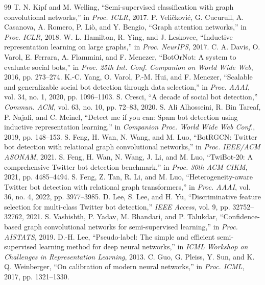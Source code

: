 \documentclass[conference]{IEEEtran}
\begin{document}
\begin{thebibliography}{99}
 T. N. Kipf and M. Welling, ``Semi-supervised classification with graph convolutional networks,'' in \emph{Proc. ICLR}, 2017.
 P. Veli\v{c}kovi\'c, G. Cucurull, A. Casanova, A. Romero, P. Li\`o, and Y. Bengio, ``Graph attention networks,'' in \emph{Proc. ICLR}, 2018.
 W. L. Hamilton, R. Ying, and J. Leskovec, ``Inductive representation learning on large graphs,'' in \emph{Proc. NeurIPS}, 2017.
 C. A. Davis, O. Varol, E. Ferrara, A. Flammini, and F. Menczer, ``BotOrNot: A system to evaluate social bots,'' in \emph{Proc. 25th Int. Conf. Companion on World Wide Web}, 2016, pp. 273--274.
 K.-C. Yang, O. Varol, P.-M. Hui, and F. Menczer, ``Scalable and generalizable social bot detection through data selection,'' in \emph{Proc. AAAI}, vol. 34, no. 1, 2020, pp. 1096--1103.
 S. Cresci, ``A decade of social bot detection,'' \emph{Commun. ACM}, vol. 63, no. 10, pp. 72--83, 2020.
 S. Ali Alhosseini, R. Bin Tareaf, P. Najafi, and C. Meinel, ``Detect me if you can: Spam bot detection using inductive representation learning,'' in \emph{Companion Proc. World Wide Web Conf.}, 2019, pp. 148--153.
 S. Feng, H. Wan, N. Wang, and M. Luo, ``BotRGCN: Twitter bot detection with relational graph convolutional networks,'' in \emph{Proc. IEEE/ACM ASONAM}, 2021.
 S. Feng, H. Wan, N. Wang, J. Li, and M. Luo, ``TwiBot-20: A comprehensive Twitter bot detection benchmark,'' in \emph{Proc. 30th ACM CIKM}, 2021, pp. 4485--4494.
 S. Feng, Z. Tan, R. Li, and M. Luo, ``Heterogeneity-aware Twitter bot detection with relational graph transformers,'' in \emph{Proc. AAAI}, vol. 36, no. 4, 2022, pp. 3977--3985.
 D. Lee, S. Lee, and H. Yu, ``Discriminative feature selection for multi-class Twitter bot detection,'' \emph{IEEE Access}, vol. 9, pp. 32752--32762, 2021.
 S. Vashishth, P. Yadav, M. Bhandari, and P. Talukdar, ``Confidence-based graph convolutional networks for semi-supervised learning,'' in \emph{Proc. AISTATS}, 2019.
 D.-H. Lee, ``Pseudo-label: The simple and efficient semi-supervised learning method for deep neural networks,'' in \emph{ICML Workshop on Challenges in Representation Learning}, 2013.
 C. Guo, G. Pleiss, Y. Sun, and K. Q. Weinberger, ``On calibration of modern neural networks,'' in \emph{Proc. ICML}, 2017, pp. 1321--1330.

\end{thebibliography}
\end{document}
